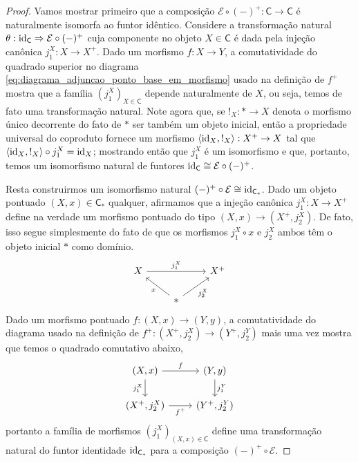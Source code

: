 \begin{proof}
  Vamos mostrar primeiro que a composição $\mathcal{E} \circ (-)^{+}: \mathsf{C} \to \mathsf{C}$ é naturalmente isomorfa ao funtor idêntico.
  Considere a transformação natural $\theta: \mathrm{id}_{\mathsf{C}} \Rightarrow \mathcal{E} \circ (-)^{+}$ cuja componente no objeto $X \in \mathsf{C}$ é dada pela injeção canônica $j^{X}_{1}: X \to X^{+}$.
  Dado um morfismo $f: X \to Y$, a comutatividade do quadrado superior no diagrama \eqref{eq:diagrama_adjuncao_ponto_base_em_morfismo} usado na definição de $f^{+}$ mostra que a família $(j^{X}_{1})_{X \in \mathsf{C}}$ depende naturalmente de $X$, ou seja, temos de fato uma transformação natural.
  Note agora que, se $!_{X}: * \to X$ denota o morfismo único decorrente do fato de $*$ ser também um objeto inicial, então a propriedade universal do coproduto fornece um morfismo $\langle \mathrm{id}_{X}, !_{X} \rangle: X^{+} \to X$ tal que $\langle \mathrm{id}_{X}, !_{X} \rangle \circ j^{X}_{1} = \mathrm{id}_{X}$; mostrando então que $j^{X}_{1}$ é um isomorfismo e que, portanto, temos um isomorfismo natural de funtores $\mathrm{id}_{\mathsf{C}} \cong \mathcal{E} \circ (-)^{+}$.

  Resta construirmos um isomorfismo natural $(-)^{+} \circ \mathcal{E} \cong \mathrm{id}_{\mathsf{C}_{*}}$.
  Dado um objeto pontuado $(X,x) \in \mathsf{C}_{*}$ qualquer, afirmamos que a injeção canônica $j^{X}_{1}: X \to X^{+}$ define na verdade um morfismo pontuado do tipo $(X,x) \to (X^{+},j^{X}_{2})$.
  De fato, isso segue simplesmente do fato de que os morfismos $j^{X}_{1} \circ x$ e $j^{X}_{2}$ ambos têm o objeto inicial $*$ como domínio.
  \begin{displaymath}
    \begin{tikzcd}
      X
      \arrow[rr, "j^{X}_{1}"]
      & & X^{+}
      \\ & *
      \arrow[lu, "x"]
      \arrow[ru, "j^{X}_{2}" swap]
    \end{tikzcd}
  \end{displaymath}
  Dado um morfismo pontuado $f: (X,x) \to (Y,y)$, a comutatividade do diagrama usado na definição de $f^{+}: (X^{+},j^{X}_{2}) \to (Y^{+},j^{Y}_{2})$ mais uma vez mostra que temos o quadrado comutativo abaixo,
  \begin{displaymath}
    \begin{tikzcd}
      (X,x)
      \arrow[r, "f"]
      \arrow[d, "j^{X}_{1}" swap]
      & (Y,y)
      \arrow[d, "j^{Y}_{1}"]
      \\ (X^{+},j^{X}_{2})
      \arrow[r, "f^{+}" swap]
      & (Y^{+}, j^{Y}_{2})
    \end{tikzcd}
  \end{displaymath}
  portanto a família de morfismos $(j^{X}_{1})_{(X,x) \in \mathsf{C}}$ define uma transformação natural do funtor identidade $\mathrm{id}_{\mathsf{C}_{*}}$ para a composição $(-)^{+} \circ \mathcal{E}$.


\end{proof}
